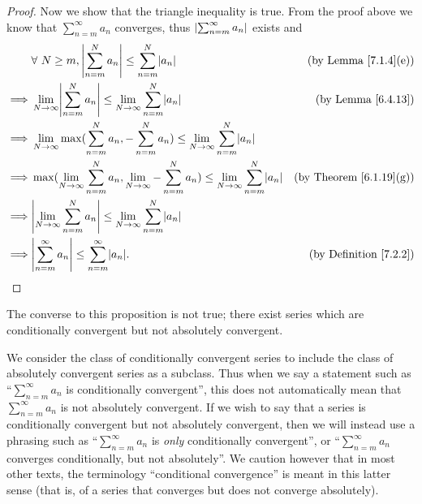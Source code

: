 \begin{proof}
    Now we show that the triangle inequality is true.
    From the proof above we know that \(\sum_{n = m}^\infty a_n\) converges, thus \(\abs*{\sum_{n = m}^\infty a_n}\) exists and
    \begin{align*}
                 & \forall\ N \geq m, \abs*{\sum_{n = m}^N a_n} \leq \sum_{n = m}^N \abs*{a_n}                                                              & \text{(by Lemma \ref{7.1.4}(e))}    \\
        \implies & \lim_{N \to \infty} \abs*{\sum_{n = m}^N a_n} \leq \lim_{N \to \infty} \sum_{n = m}^N \abs*{a_n}                                         & \text{(by Lemma \ref{6.4.13})}      \\
        \implies & \lim_{N \to \infty} \max(\sum_{n = m}^N a_n, -\sum_{n = m}^N a_n) \leq \lim_{N \to \infty} \sum_{n = m}^N \abs*{a_n}                                                           \\
        \implies & \max(\lim_{N \to \infty} \sum_{n = m}^N a_n, \lim_{N \to \infty} -\sum_{n = m}^N a_n) \leq \lim_{N \to \infty} \sum_{n = m}^N \abs*{a_n} & \text{(by Theorem \ref{6.1.19}(g))} \\
        \implies & \abs*{\lim_{N \to \infty} \sum_{n = m}^N a_n} \leq \lim_{N \to \infty} \sum_{n = m}^N \abs*{a_n}                                                                               \\
        \implies & \abs*{\sum_{n = m}^\infty a_n} \leq \sum_{n = m}^\infty \abs*{a_n}.                                                                      & \text{(by Definition \ref{7.2.2})}
    \end{align*}
\end{proof}

\begin{remark}\label{7.2.10}
    The converse to this proposition is not true;
    there exist series which are conditionally convergent but not absolutely convergent.
\end{remark}

\begin{remark}\label{7.2.11}
    We consider the class of conditionally convergent series to include the class of absolutely convergent series as a subclass.
    Thus when we say a statement such as ``\(\sum_{n = m}^\infty a_n\) is conditionally convergent'', this does not automatically mean that \(\sum_{n = m}^\infty a_n\) is not absolutely convergent.
    If we wish to say that a series is conditionally convergent but not absolutely convergent, then we will instead use a phrasing such as ``\(\sum_{n = m}^\infty a_n\) is \emph{only} conditionally convergent'', or ``\(\sum_{n = m}^\infty a_n\) converges conditionally, but not absolutely''.
    We caution however that in most other texts, the terminology ``conditional convergence'' is meant in this latter sense
    (that is, of a series that converges but does not converge absolutely).
\end{remark}

